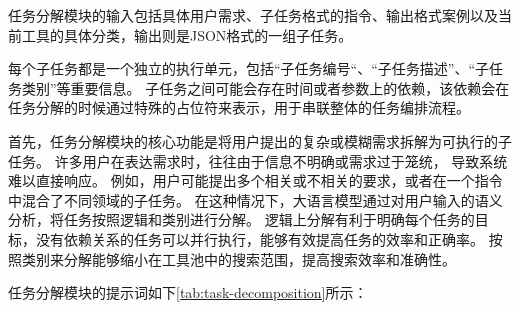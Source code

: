 任务分解模块的输入包括具体用户需求、子任务格式的指令、输出格式案例以及当前工具的具体分类，输出则是JSON格式的一组子任务。

每个子任务都是一个独立的执行单元，包括“子任务编号“、“子任务描述”、“子任务类别”等重要信息。
子任务之间可能会存在时间或者参数上的依赖，该依赖会在任务分解的时候通过特殊的占位符来表示，用于串联整体的任务编排流程。

首先，任务分解模块的核心功能是将用户提出的复杂或模糊需求拆解为可执行的子任务。
许多用户在表达需求时，往往由于信息不明确或需求过于笼统，
导致系统难以直接响应。
例如，用户可能提出多个相关或不相关的要求，或者在一个指令中混合了不同领域的子任务。
在这种情况下，大语言模型通过对用户输入的语义分析，将任务按照逻辑和类别进行分解。
逻辑上分解有利于明确每个任务的目标，没有依赖关系的任务可以并行执行，能够有效提高任务的效率和正确率。
按照类别来分解能够缩小在工具池中的搜索范围，提高搜索效率和准确性。

任务分解模块的提示词如下\ref{tab:task-decomposition}所示：


